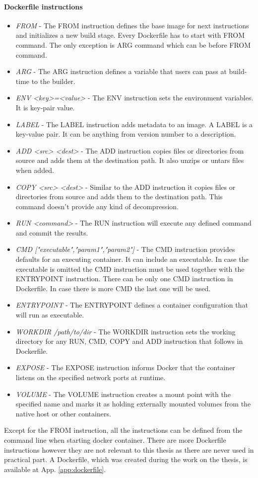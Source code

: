 \paragraph{Dockerfile instructions}
\begin{itemize}
\item \textit{FROM} - The FROM instruction defines the base image for next instructions and initializes a new build stage. Every Dockerfile
has to start with FROM command. The only exception is ARG command which can be before FROM command.
\item \textit{ARG} - The ARG instruction defines a variable that users can pass at build-time to the builder.
\item \textit{ENV <key>=<value>} - The ENV instruction sets the environment variables. It is key-pair value. 
\item \textit{LABEL} - The LABEL instruction adds metadata to an image. A LABEL is a key-value pair. It can be anything from version number to a description.
\item \textit{ADD <src> <dest>} - The ADD instruction copies files or directories from source and adds them at the destination path. It also unzips or untars files when added.
\item \textit{COPY <src> <dest>} - Similar to the ADD instruction it copies files or directories from source and adds them to the destination path. This command doesn't provide any kind of decompression.
\item \textit{RUN <command>} - The RUN instruction will execute any defined command and commit the results.
\item \textit{CMD ["executable","param1","param2"]} - The CMD instruction provides defaults for an executing container. It can include an
executable. In case the executable is omitted the CMD instruction must be used together with the ENTRYPOINT instruction. There can be only
one CMD instruction in Dockerfile. In case there is more CMD the last one will be used.
\item \textit{ENTRYPOINT} - The ENTRYPOINT defines a container configuration that will run as executable.
\item \textit{WORKDIR /path/to/dir} - The WORKDIR instruction sets the working directory for any RUN, CMD, COPY and ADD instruction that follows in Dockerfile.
\item \textit{EXPOSE} - The EXPOSE instruction informs Docker that the container listens on the specified network ports at runtime.
\item \textit{VOLUME} - The VOLUME instruction creates a mount point with the specified name and marks it as holding externally mounted volumes from the native host or other containers.
\end{itemize}

Except for the FROM instruction, all the instructions can be defined from the command line when starting docker container. There are more Dockerfile instructions however they are not relevant to this thesis as there are never used in practical part. A Dockerfile, which was created during the work on the thesis, is available at App. \ref{app:dockerfile}.

